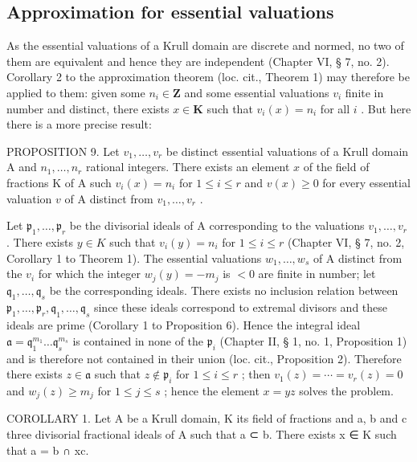 \subsection{Approximation for essential valuations}

As the essential valuations of a Krull domain are discrete and normed, no two of them are equivalent and hence they are independent (Chapter VI, § 7, no. 2). Corollary 2 to the approximation theorem (loc. cit., Theorem 1) may therefore be applied to them: given some \(n_i \in \mathbf{Z}\) and some essential valuations \(v_i\) finite in number and distinct, there exists \(x \in \mathbf{K}\) such that \(v_i(x) = n_i\) for all \(i\) . But here there is a more precise result:

PROPOSITION 9. Let \(v_1, \ldots, v_r\) be distinct essential valuations of a Krull domain A and \(n_1, \ldots, n_r\) rational integers. There exists an element \(x\) of the field of fractions K of A such \(v_i(x) = n_i\) for \(1 \leqslant i \leqslant r\) and \(v(x) \geqslant 0\) for every essential valuation \(v\) of A distinct from \(v_1, \ldots, v_r\) .

Let \(\mathfrak{p}_1, \ldots, \mathfrak{p}_r\) be the divisorial ideals of A corresponding to the valuations \(v_1, \ldots, v_r\) . There exists \(y \in K\) such that \(v_i(y) = n_i\) for \(1 \leqslant i \leqslant r\) (Chapter VI, § 7, no. 2, Corollary 1 to Theorem 1). The essential valuations \(w_1, \ldots, w_s\) of A distinct from the \(v_i\) for which the integer \(w_j(y) = -m_j\) is \(<0\) are finite in number; let \(\mathfrak{q}_1, \ldots, \mathfrak{q}_s\) be the corresponding ideals. There exists no inclusion relation between \(\mathfrak{p}_1, \ldots, \mathfrak{p}_r, \mathfrak{q}_1, \ldots, \mathfrak{q}_s\) since these ideals correspond to extremal divisors and these ideals are prime (Corollary 1 to Proposition 6). Hence the integral ideal \(\mathfrak{a} = \mathfrak{q}_1^{m_1} \ldots \mathfrak{q}_s^{m_s}\) is contained in none of the \(\mathfrak{p}_i\) (Chapter II, § 1, no. 1, Proposition 1) and is therefore not contained in their union (loc. cit., Proposition 2). Therefore there exists \(z \in \mathfrak{a}\) such that \(z \notin \mathfrak{p}_i\) for \(1 \leqslant i \leqslant r\) ; then \(v_1(z) = \cdots = v_r(z) = 0\) and \(w_j(z) \geqslant m_j\) for \(1 \leqslant j \leqslant s\) ; hence the element \(x = yz\) solves the problem.

COROLLARY 1. Let A be a Krull domain, K its field of fractions and a, b and c three divisorial fractional ideals of A such that a ⊂ b. There exists x ∈ K such that a = b ∩ xc.

